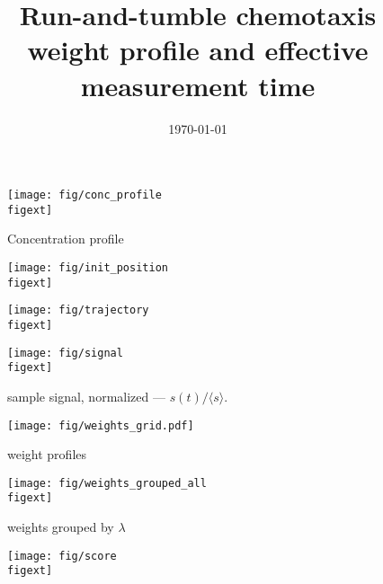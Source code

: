 \documentclass{article}
\title{\huge Run-and-tumble chemotaxis \\ \large weight profile and effective measurement time}
\date{\today}
\begin{document}

\maketitle

\noindent\hrulefill
{}
\noindent\hrulefill

\begin{minipage}{0.55\textwidth}
\begin{figure}[H]
\texttt{[image: fig/conc\_profile\\figext]}
\caption{Concentration profile}
\end{figure}
\end{minipage}
\begin{minipage}{0.25\textwidth}
\end{minipage}\hfill

\begin{minipage}{0.48\textwidth}
\begin{figure}[H]
\texttt{[image: fig/init\_position\\figext]}
\end{figure}
\end{minipage}
\begin{minipage}{0.48\textwidth}
\begin{figure}[H]
\texttt{[image: fig/trajectory\\figext]}
\end{figure}
\end{minipage}\hfill


\begin{figure}[H]
\texttt{[image: fig/signal\\figext]}
\caption{sample signal, normalized ---  $s(t)/\langle s \rangle$.}
\hfill
\end{figure}

\begin{figure}[H]
\begin{center}
\hspace*{-1cm}\texttt{[image: fig/weights\_grid.pdf]}
\end{center}
\caption{weight profiles}
\end{figure}

\begin{figure}[H]
\begin{center}
\hspace*{-1cm}\texttt{[image: fig/weights\_grouped\_all\\figext]}
\end{center}
\caption{weights grouped by $\lambda$}
\end{figure}

\begin{figure}[H]
\texttt{[image: fig/score\\figext]}
\end{figure}
\end{document}
